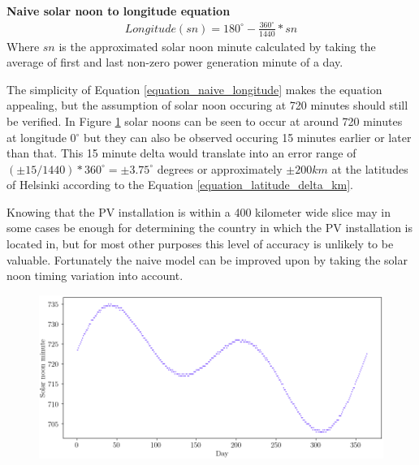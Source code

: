 \noindent\textbf{Naive solar noon to longitude equation}
%
\begin{equation}
\begin{split}
\label{equation_naive_longitude}
Longitude(sn)=180^\circ-\frac{360^\circ}{1440}*sn
\end{split}
\end{equation}
Where $sn$ is the approximated solar noon minute calculated by taking the average of first and last non-zero power generation minute of a day. %

\hfill \break


\noindent The simplicity of Equation \ref{equation_naive_longitude} makes the equation appealing, but the assumption of solar noon occuring at 720 minutes should still be verified. In Figure \ref{fig_solarnoons} solar noons can be seen to occur at around 720 minutes at longitude 0$^\circ$ but they can also be observed occuring 15 minutes earlier or later than that. This 15 minute delta would translate into an error range of $(\pm 15/1440)*360^\circ = \pm 3.75^\circ$ degrees or approximately $\pm 200 km$ at the latitudes of Helsinki according to the Equation \ref{equation_latitude_delta_km}.


Knowing that the PV installation is within a 400 kilometer wide slice may in some cases be enough for determining the country in which the PV installation is located in, but for most other purposes this level of accuracy is unlikely to be valuable. Fortunately the naive model can be improved upon by taking the solar noon timing variation into account. \hfill \break

\begin{figure}[ht!]
\centering
\includegraphics[width=1\linewidth]{pics/solarnoons2}
\label{fig_solarnoons}
\end{figure}



